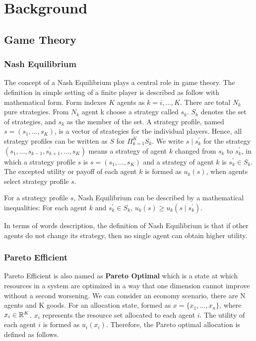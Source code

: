 \chapter{Background} \label{Chapter:Background}

\section{Game Theory}

\subsection{Nash Equilibrium}
The concept of a Nash Equilibrium plays a central role in game theory. The definition in simple setting of a finite player is described as follow with mathematical form. Form indexes $K$ agents as $k=i, \dots, K$. There are total $N_k$ pure strategies. From $N_k$ agent k choose a strategy called $s_k$. $S_k$ denotes the set of strategies, and $s_k$ as the member of the set. A strategy profile, named $s = (s_1, ..., s_K)$, is a vector of strategies for the individual players. Hence, all strategy profiles can be written as $S$ for $\Pi_{k=1}^{K} S_{k}$. We write $s \mid s_{k}^{\prime}$ for the strategy $\left(s_{1}, \ldots, s_{k-1}, s_{k+1}^{\prime}, \ldots, s_{K}\right)$ means a strategy of agent $k$ changed from $s_k$ to $s_{k}^{\prime}$, in which a strategy profile $s$ is $s = (s_1, ..., s_K)$ and a strategy of agent $k$ is $s_{k}^{\prime} \in S_{k}$. The excepted utility or payoff of each agent $k$ is formed as $u_k(s)$, when agents select strategy profile $s$\parencite{Kreps1989}.
\begin{proposition}
For a strategy profile $s$, Nash Equilibrium can be described by a mathematical inequalities: For each agent $k$ and $s_{k}^{\prime} \in S_{k}$, $u_{k}(s) \geqslant u_{k}\left(s \mid s_{k}^{\prime}\right)$.
\end{proposition}
In terms of words description, the definition of Nash Equilibrium is that if other agents do not change its strategy, then no single agent can obtain higher utility. 
 
\subsection{Pareto Efficient}
Pareto Efficient is also named as \textbf{Pareto Optimal} which is a state at which resources in a system are optimized in a way that one dimension cannot improve without a second worsening. We can consider an economy scenario, there are N agents and K goods. For an allocation state, formed as $x=\{x_1, \dots, x_n\}$, where $x_i \in \mathbb{R}^{K}$. $x_i$ represents the resource set allocated to each agent $i$. The utility of each agent $i$ is formed as $u_i(x_i)$. Therefore, the Pareto optimal allocation is defined as follows.

